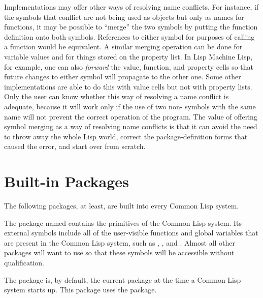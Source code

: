 Implementations may offer other ways of resolving name conflicts.
For instance, if the symbols that conflict are not being used as
objects but only as names for functions, it may be possible to ``merge''
the two symbols by putting the function definition onto both symbols.
References to either symbol for purposes of calling a function would be
equivalent.  A similar merging operation can be done for variable values
and for things stored on the property list.  In Lisp Machine Lisp, for example, one can
also {\it forward} the value, function, and property cells so that future
changes to either symbol will propagate to the other one.  Some other
implementations are able to do this with value cells but not with
property lists.  Only the user can know whether this way of resolving
a name conflict is adequate, because it will work only if
the use of two non-
symbols with the same name will not prevent the correct operation of
the program.  The value of offering symbol merging as a way of resolving
name conflicts is that it can avoid the need to throw away the whole
Lisp world, correct the package-definition forms
that caused the error, and start over from scratch.

\section{Built-in Packages}

\begin{obsolete}
\noindent
The following packages, at least, are built into every Common Lisp system.

\begin{flushdesc}
\item[\cd{lisp}]
The package named  contains the primitives of the
Common Lisp system.  Its external symbols include all of the
user-visible functions and global variables that are present in the
Common Lisp system, such as , , and .
Almost all other packages will want to use  so that these
symbols will be accessible without qualification.

\item[\cd{user}]
The  package is, by default, the current package at the time
a Common Lisp system starts up.  This package uses the  package.
\end{flushdesc}
\end{obsolete}

